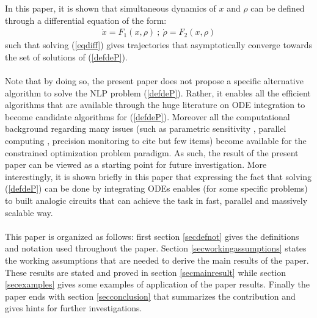 \documentclass{article}
\begin{document}
In this paper, it is shown that simultaneous dynamics of $x$ and $\rho$ can be defined through a differential equation of the form:
\begin{eqnarray}
\dot x=F_1(x,\rho)\ ;\ \dot\rho=F_2(x,\rho) \label{eqdiff} 
\end{eqnarray} 
such that solving (\ref{eqdiff}) gives trajectories that asymptotically converge towards the set of solutions of (\ref{defdeP}). \ \\ \ \\ 
Note that by doing so, the present paper does not propose a specific alternative algorithm to solve the NLP problem (\ref{defdeP}). Rather, it enables all the efficient algorithms that are available through the huge literature on ODE integration to become candidate algorithms for (\ref{defdeP}). Moreover all the computational background regarding many issues (such as parametric sensitivity \cite{Leis:1988}, parallel computing \cite{Voss199765},  precision monitoring to cite but few items) become  available for the constrained optimization problem paradigm. As such, the result of the present paper can be viewed as a starting point for future investigation. More interestingly, it is shown briefly in this paper that expressing the fact that solving (\ref{defdeP}) can be done by integrating ODEs enables (for some specific problems) to built analogic circuits that can achieve the task in fast, parallel and massively scalable way. \ \\ \ \\ 
This paper is organized as follows: first section \ref{secdefnot} gives the definitions and notation used throughout the paper. Section \ref{secworkingassumptions} states the working assumptions that are needed to derive the main results of the paper. These results are stated and proved in section \ref{secmainresult} while section \ref{secexamples} gives some examples of application of the paper results. Finally the paper ends with section \ref{secconclusion} that summarizes the contribution and gives hints for further investigations.    
\end{document}
